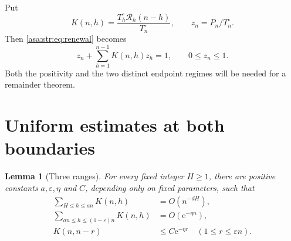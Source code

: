 \documentclass[11pt,letterpaper]{article}
\newtheorem{lemma}[theorem]{Lemma}
\theoremstyle{remark}\newtheorem{remark}[theorem]{Remark}
\numberwithin{equation}{section}
\newcommand{\ee}{\mathrm e}
\begin{document}
Put
\begin{equation}\label{asa:str:eq:kernel}
 K(n,h)=\frac{T^{\circ}_h\mathcal R_h(n-h)}{T^{\circ}_n},\qquad z_n=P_n/T^{\circ}_n.
\end{equation}
Then \eqref{asa:str:eq:renewal} becomes
\begin{equation}\label{asa:str:eq:zrenew}
 z_n+\sum_{h=1}^{n-1}K(n,h)z_h=1,\qquad 0\le z_n\le1.
\end{equation}
Both the positivity and the two distinct endpoint regimes will be needed for a remainder theorem.

\section{Uniform estimates at both boundaries}\label{asa:str:sec:boundaries}
\begin{lemma}[Three ranges]\label{asa:str:lem:ranges}
For every fixed integer $H\ge1$, there are positive constants $a,\varepsilon,\eta$ and $C$, depending only on fixed parameters, such that
\begin{align}
 \sum_{H\le h\le an}K(n,h)&=O(n^{-dH}),\label{asa:str:eq:left}\\
 \sum_{an\le h\le(1-\varepsilon)n}K(n,h)&=O(\ee^{-\eta n}),\label{asa:str:eq:middle}\\
 K(n,n-r)&\le C\ee^{-\eta r}\quad(1\le r\le\varepsilon n).\label{asa:str:eq:right}
\end{align}
\end{lemma}
\end{document}
